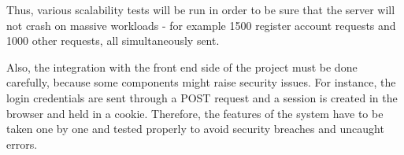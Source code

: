 Thus, various scalability tests will be run in order to be sure that the server will not crash on massive workloads - for example 1500 register account requests and 1000 other requests, all simultaneously sent.

Also, the integration with the front end side of the project must be done carefully, because some components might raise security issues. For instance, the login credentials are sent through a POST request and a session is created in the browser and held in a cookie. Therefore, the features of the system have to be taken one by one and tested properly to avoid security breaches and uncaught errors.